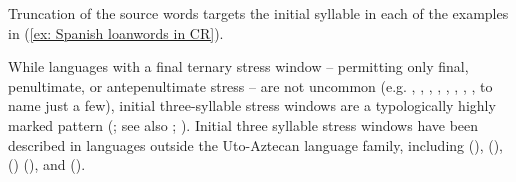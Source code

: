 Truncation of the source words targets the initial syllable in each of the examples in (\ref{ex: Spanish loanwords in CR}).

While languages with a final ternary stress window -- permitting only final, penultimate, or antepenultimate stress -- are not uncommon (e.g.  , , , , , , , , to name just a few), initial three-syllable stress windows are a typologically highly marked pattern (\citealt{kager2012stress}; see also \citealt{caballero2011morphologically}; \citealt{martinez2013exploration}). Initial three syllable stress windows have been described in languages outside the Uto-Az\-tec\-an language family, including  (),  (),  () (\cite{kager2012stress}), and  (\cite{hualde1998gap}).


